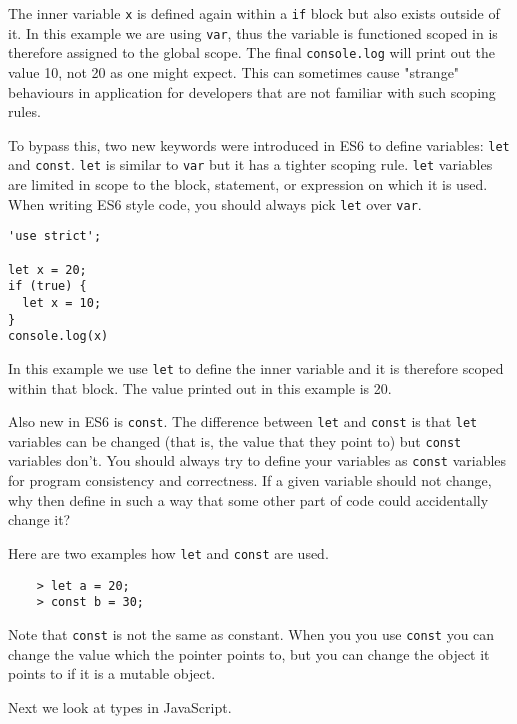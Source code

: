 The inner variable \texttt{x} is defined again within a \texttt{if} block but also exists outside of it. In this example we are using \texttt{var}, thus the variable is functioned scoped in is therefore assigned to the global scope. The final \texttt{console.log} will print out the value 10, not 20 as one might expect. This can sometimes cause "strange" behaviours in application for developers that are not familiar with such scoping rules.

To bypass this, two new keywords were introduced in ES6 to define variables: \texttt{let} and \texttt{const}. \texttt{let} is similar to \texttt{var} but it has a tighter scoping rule. \texttt{let} variables are limited in scope to the block, statement, or expression on which it is used. When writing ES6 style code, you should always pick \texttt{let} over \texttt{var}.


\begin{lstlisting}
'use strict';

let x = 20;
if (true) {
  let x = 10;
}
console.log(x)
\end{lstlisting}

In this example we use \texttt{let} to define the inner variable and it is therefore scoped within that block. The value printed out in this example is 20.

Also new in ES6 is \texttt{const}. The difference between \texttt{let} and \texttt{const} is that \texttt{let} variables can be changed (that is, the value that they point to) but \texttt{const} variables don't. You should always try to define your variables as \texttt{const} variables for program consistency and correctness. If a given variable should not change, why then define in such a way that some other part of code could accidentally change it?

Here are two examples how \texttt{let} and \texttt{const} are used.

\begin{lstlisting}
    > let a = 20;
    > const b = 30;
\end{lstlisting}

Note that \texttt{const} is not the same as constant. When you you use \texttt{const} you can change the value which the pointer points to, but you can change the object it points to if it is a mutable object.

Next we look at types in JavaScript.

